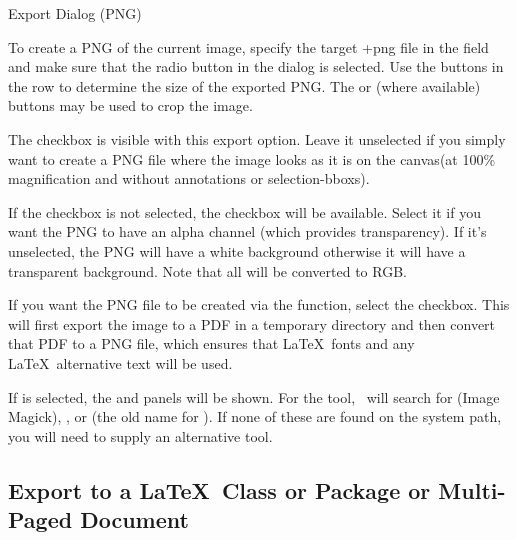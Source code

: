  {}
 {Export Dialog (PNG)}

To create a PNG of the current image, specify the target \ext+{png}
file in the  field and make sure that the 
radio button in the  dialog is selected. 
Use the buttons in the  row to determine the
size of the exported PNG. The 
or (where available)  buttons may be
used to crop the image.

The  checkbox is visible with this export
option. Leave it unselected if you simply want to create a PNG file where the image
looks as it is  on the \gls{canvas}(at
100\% magnification and without annotations or
\glspl{selection-bbox}).


If the  checkbox is not selected, the
 checkbox will be available. Select it if
you want the PNG to have an alpha channel (which provides
transparency). If it's unselected, the PNG will have a white
background otherwise it will have a \gls{transparent} background.
Note that all  will be converted to RGB.

If you want the PNG file to be created via the
 function, select the
 checkbox. This will first export the
image to a PDF in a temporary directory and then convert that PDF to
a PNG file, which ensures that \LaTeX\ fonts and any \LaTeX\
alternative text will be used.


If  is selected, the 
and  panels will be shown. 
For the \widget{processes.pdftopng} tool, \FlowframTk\ will search
for  (Image Magick), \app{pdftoppm}, or
 (the old name for \app{magick}). If none of these are
found on the system path, you will need to supply an alternative
tool.

\subsection{Export to a \LaTeX\ Class or Package or Multi-Paged Document}
\label{sec:exportsty}


